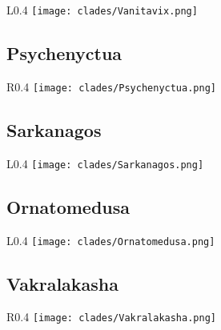 \begin{wrapfigure}{L}{0.4\textwidth}
	\centering
	\texttt{[image: clades/Vanitavix.png]}
\end{wrapfigure}

\lipsum[3]

\subsection{Psychenyctua}

\begin{wrapfigure}{R}{0.4\textwidth}
	\centering
	\texttt{[image: clades/Psychenyctua.png]}
\end{wrapfigure}

\lipsum[4]

\subsection{Sarkanagos}

\begin{wrapfigure}{L}{0.4\textwidth}
	\centering
	\texttt{[image: clades/Sarkanagos.png]}
\end{wrapfigure}

\lipsum[5]

\subsection{Ornatomedusa}

\begin{wrapfigure}{L}{0.4\textwidth}
	\centering
	\texttt{[image: clades/Ornatomedusa.png]}
\end{wrapfigure}

\lipsum[6]

\subsection{Vakralakasha}

\begin{wrapfigure}{R}{0.4\textwidth}
	\centering
	\texttt{[image: clades/Vakralakasha.png]}
\end{wrapfigure}

\lipsum[6]